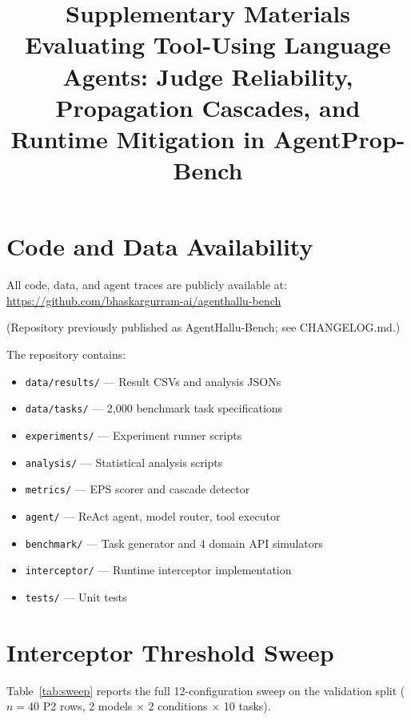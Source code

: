 \documentclass[11pt]{article}
\title{Supplementary Materials\\[0.5em]
\large Evaluating Tool-Using Language Agents: Judge Reliability,
Propagation Cascades, and Runtime Mitigation in AgentProp-Bench}
\date{}
\begin{document}
\maketitle

\tableofcontents
\newpage

\section{Code and Data Availability}

All code, data, and agent traces are publicly available at:
\url{https://github.com/bhaskargurram-ai/agenthallu-bench}

\noindent (Repository previously published as AgentHallu-Bench; see CHANGELOG.md.)

The repository contains:
\begin{itemize}
    \item \texttt{data/results/} --- Result CSVs and analysis JSONs
    \item \texttt{data/tasks/} --- 2,000 benchmark task specifications
    \item \texttt{experiments/} --- Experiment runner scripts
    \item \texttt{analysis/} --- Statistical analysis scripts
    \item \texttt{metrics/} --- EPS scorer and cascade detector
    \item \texttt{agent/} --- ReAct agent, model router, tool executor
    \item \texttt{benchmark/} --- Task generator and 4 domain API simulators
    \item \texttt{interceptor/} --- Runtime interceptor implementation
    \item \texttt{tests/} --- Unit tests
\end{itemize}

\section{Interceptor Threshold Sweep}

Table~\ref{tab:sweep} reports the full 12-configuration sweep on the
validation split ($n{=}40$ P2 rows, 2 models $\times$ 2 conditions
$\times$ 10 tasks).



\end{document}
